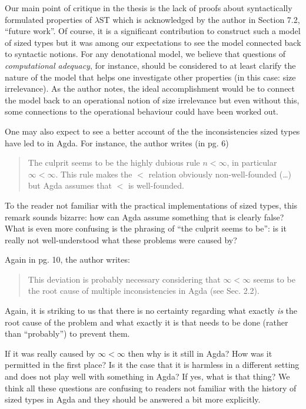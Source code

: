\documentclass[a4paper, 11pt]{article}
\begin{document}
Our main point of critique in the thesis is the lack of proofs about syntactically
formulated properties of $\lambda$ST which is acknowledged by the author in Section 7.2,
``future work''. Of course, it is a significant contribution to construct such a model of
sized types but it was among our expectations to see the model connected back to syntactic
notions. For any denotational model, we believe that questions of \emph{computational
  adequacy}, for instance, should be considered to at least clarify the nature of the
model that helps one investigate other properties (in this case: size irrelevance). As the
author notes, the ideal accomplishment would be to connect the model back to an
operational notion of size irrelevance but even without this, some connections to the
operational behaviour could have been worked out.

One may also expect to see a better account of the the inconsistencies sized types have
led to in Agda. For instance, the author writes (in pg. 6)
\begin{quote}
  The culprit seems to be the highly dubious rule $n < \infty$, in particular $\infty < \infty$.
  This rule makes the $<$ relation obviously non-well-founded (\ldots) but Agda assumes that
  $<$ is well-founded.
\end{quote}
To the reader not familiar with the practical implementations of sized types, this remark
sounds bizarre: how can Agda assume something that is clearly false? What is even more
confusing is the phrasing of ``the culprit seems to be'': is it really not well-understood
what these problems were caused by?

Again in pg. 10, the author writes:
\begin{quote}
  This deviation is probably necessary considering that $\infty < \infty$ seems to be the root cause
  of multiple inconsistencies in Agda (see Sec. 2.2).
\end{quote}
Again, it is striking to us that there is no certainty regarding what exactly \emph{is}
the root cause of the problem and what exactly it is that needs to be done (rather than
``probably'') to prevent them.

If it was really caused by $\infty < \infty$ then why is it still in Agda? How was it permitted in
the first place? Is it the case that it is harmless in a different setting and does not
play well with something in Agda? If yes, what is that thing? We think all these questions
are confusing to readers not familiar with the history of sized types in Agda and they
should be answered a bit more explicitly.
\end{document}
